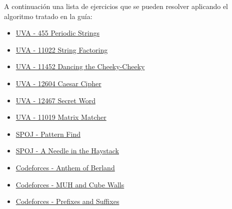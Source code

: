 A continuación una lista de ejercicios que se pueden resolver aplicando el algoritmo tratado en la guía:
\begin{itemize}
	\item \href{http://uva.onlinejudge.org/index.php?option=onlinejudge&page=show_problem&problem=396}{UVA - 455 Periodic Strings}
	\item \href{http://uva.onlinejudge.org/index.php?option=onlinejudge&page=show_problem&problem=1963}{UVA - 11022 String Factoring}
	\item \href{http://uva.onlinejudge.org/index.php?option=onlinejudge&page=show_problem&problem=2447}{UVA - 11452 Dancing the Cheeky-Cheeky}
	\item \href{https://uva.onlinejudge.org/index.php?option=com_onlinejudge&Itemid=8&page=show_problem&problem=4282}{UVA - 12604  Caesar Cipher}
	\item \href{https://uva.onlinejudge.org/index.php?option=com_onlinejudge&Itemid=8&page=show_problem&problem=3911}{UVA - 12467 Secret Word}
	\item \href{https://uva.onlinejudge.org/index.php?option=onlinejudge&page=show_problem&problem=1960}{UVA - 11019 Matrix Matcher}
	\item \href{http://www.spoj.com/problems/NAJPF/}{SPOJ - Pattern Find}
	\item \href{https://www.spoj.com/problems/NHAY/}{SPOJ - A Needle in the Haystack}
	\item \href{http://codeforces.com/contest/808/problem/G}{Codeforces - Anthem of Berland}
	\item \href{http://codeforces.com/problemset/problem/471/D}{Codeforces - MUH and Cube Walls}
	\item \href{https://codeforces.com/contest/432/problem/D}{Codeforces - Prefixes and Suffixes}
\end{itemize}